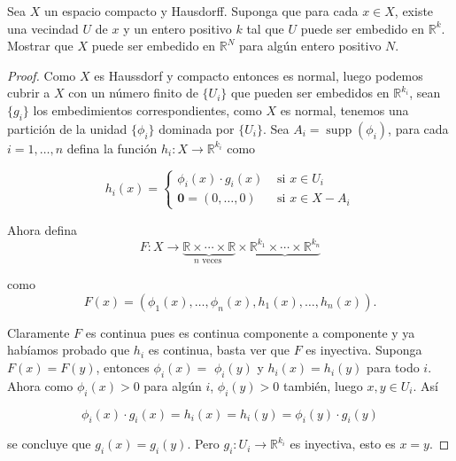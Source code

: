 
\item Sea \( X \) un espacio compacto y Hausdorff. Suponga que para cada \( x \in X \), existe una vecindad \( U \) de \( x \) y un entero positivo \( k \) tal que \( U \) puede ser embedido en \( \mathbb{R}^k \). Mostrar que \( X \) puede ser embedido en \( \mathbb{R}^N \) para algún entero positivo \( N \).

\begin{proof}
    Como $X$ es Haussdorf y compacto entonces es normal, luego podemos cubrir a $X$ con un número finito de $\{U_i\}$ que pueden ser embedidos en $\mathbb{R}^{k_i}$, sean $\{g_i\}$ los embedimientos correspondientes, como $X$ es normal, tenemos una partición de la unidad $\{\phi_i\}$ dominada por $\{U_i\}$. Sea $A_i=\operatorname{supp}(\phi_i)$, para cada $i=1,\ldots,n$ defina la función $h_i: X\rightarrow \mathbb{R}^{k_i}$ como

    $$
h_i(x)= \begin{cases}\phi_i(x) \cdot g_i(x) & \text { si } x \in U_i \\ \mathbf{0}=(0, \ldots, 0) & \text { si } x \in X-A_i\end{cases}
$$

Ahora defina
$$
F: X \longrightarrow\underbrace{\mathbb{R} \times \cdots \times \mathbb{R}}_{n \text { veces }} \times \underbrace{\mathbb{R}^{k_1} \times \cdots \times \mathbb{R}^{k_n}}
$$

como
$$
F(x)=\left(\phi_1(x), \ldots, \phi_n(x), h_1(x), \ldots, h_n(x)\right).
$$

Claramente $F$ es continua pues es continua componente a componente y ya habíamos probado que $h_i$ es continua, basta ver que $F$ es inyectiva. Suponga $F(x)=F(y)$, entonces $\phi_i(x)=$ $\phi_i(y)$ y $h_i(x)=h_i(y)$ para todo $i$. Ahora como $\phi_i(x)>0$ para algún $i$, $\phi_i(y)>0$ también, luego $x, y \in U_i$. Así

$$
\phi_i(x) \cdot g_i(x)=h_i(x)=h_i(y)=\phi_i(y) \cdot g_i(y)
$$


se concluye que $g_i(x)=g_i(y)$. Pero $g_i: U_i \rightarrow \mathbb{R}^{k_i}$ es inyectiva, esto es $x=y$.

\end{proof}